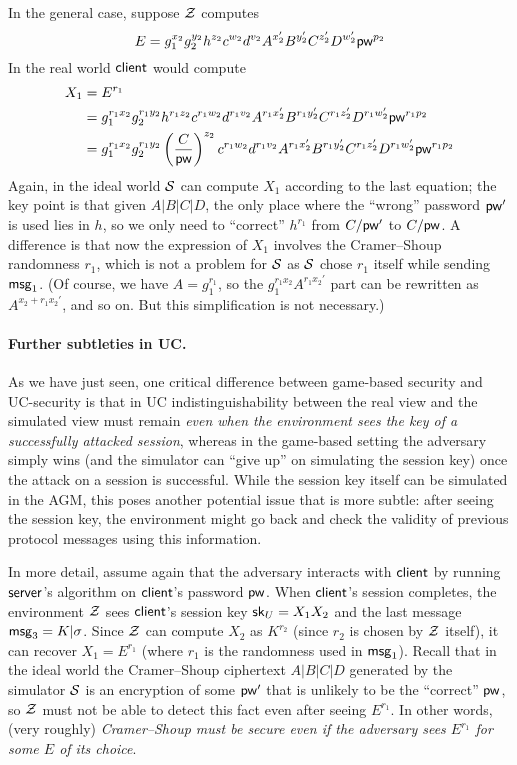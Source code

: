 In the general case, suppose $\mathcal{Z}$ computes
\[
E = g_1^{x_2}g_2^{y_2}h^{z_2}c^{w_2}d^{v_2}A^{x_2'}B^{y_2'}C^{z_2'}D^{w_2'}\mathsf{pw}^{p_2}
\]
In the real world $\mathsf{client}$ would compute
\begin{align*}
	X_1 &= E^{r_1} \\
	&= g_1^{r_1x_2} g_2^{r_1y_2} h^{r_1z_2} c^{r_1w_2} d^{r_1v_2} A^{r_1x_2'} B^{r_1y_2'} C^{r_1z_2'} D^{r_1w_2'} \mathsf{pw}^{r_1p_2} \\
	&= g_1^{r_1x_2} g_2^{r_1y_2} \left(\frac{C}{\mathsf{pw}}\right)^{z_2} c^{r_1w_2} d^{r_1v_2} A^{r_1x_2'} B^{r_1y_2'} C^{r_1z_2'} D^{r_1w_2'} \mathsf{pw}^{r_1p_2}
\end{align*}	
Again, in the ideal world $\mathcal{S}$ can compute $X_1$ according to the last equation; the key point is that given $A|B|C|D$, the only place where the ``wrong'' password $\mathsf{pw}'$ is used lies in $h$, so we only need to ``correct'' $h^{r_1}$ from $C/\mathsf{pw}'$ to $C/\mathsf{pw}$. A difference is that now the expression of $X_1$ involves the Cramer--Shoup randomness $r_1$, which is not a problem for $\mathcal{S}$ as $\mathcal{S}$ chose $r_1$ itself while sending $\mathsf{msg}_{1}$. (Of course, we have $A = g_1^{r_1}$, so the $g_1^{r_1x_2} A^{r_1x_2'}$ part can be rewritten as $A^{x_2+r_1x_2'}$, and so on. But this simplification is not necessary.)

\paragraph{Further subtleties in UC.}
As we have just seen, one critical difference between game-based security and UC-security is that in UC indistinguishability between the real view and the simulated view must remain \emph{even when the environment sees the key of a successfully attacked session}, whereas in the game-based setting the adversary simply wins (and the simulator can ``give up'' on simulating the session key) once the attack on a session is successful. While the session key itself can be simulated in the AGM, this poses another potential issue that is more subtle: after seeing the session key, the environment might go back and check the validity of previous protocol messages using this information.

In more detail, assume again that the adversary interacts with $\mathsf{client}$ by running $\mathsf{server}$'s algorithm on $\mathsf{client}$'s password $\mathsf{pw}$. When $\mathsf{client}$'s session completes, the environment $\mathcal{Z}$ sees $\mathsf{client}$'s session key $\mathsf{sk}_U = X_1X_2$ and the last message $\mathsf{msg}_{3} = K|\sigma$. Since $\mathcal{Z}$ can compute $X_2$ as $K^{r_2}$ (since $r_2$ is chosen by $\mathcal{Z}$ itself), it can recover $X_1 = E^{r_1}$ (where $r_1$ is the randomness used in $\mathsf{msg}_{1}$). Recall that in the ideal world the Cramer--Shoup ciphertext $A|B|C|D$ generated by the simulator $\mathcal{S}$ is an encryption of some $\mathsf{pw}'$ that is unlikely to be the ``correct'' $\mathsf{pw}$, so $\mathcal{Z}$ must not be able to detect this fact even after seeing $E^{r_1}$. In other words, (very roughly) \emph{Cramer--Shoup must be secure even if the adversary sees $E^{r_1}$ for some $E$ of its choice}.

